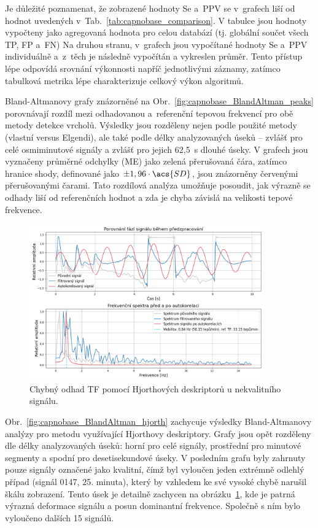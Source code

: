Je důležité poznamenat, že zobrazené hodnoty \acs{Se} a~\acs{PPV} se v~grafech liší od hodnot uvedených v~Tab.~\ref{tab:capnobase_comparison}.
V tabulce jsou hodnoty vypočteny jako agregovaná hodnota pro celou databází (tj. globální součet všech \acs{TP}, \acs{FP} a~\acs{FN})
Na druhou stranu, v~grafech jsou vypočítané hodnoty \acs{Se} a~\acs{PPV} individuálně a~z~těch je následně vypočítán a vykreslen průměr.
Tento přístup lépe odpovídá srovnání výkonnosti napříč jednotlivými záznamy, zatímco tabulková metrika lépe charakterizuje celkový výkon algoritmů.

Bland-Altmanovy grafy znázorněné na Obr.~\ref{fig:capnobase_BlandAltman_peaks} porovnávají rozdíl mezi odhadovanou a~referenční tepovou frekvencí pro obě metody detekce vrcholů.
Výsledky jsou rozděleny nejen podle použité metody (vlastní versus Elgendi), ale také podle délky analyzovaných úseků -- zvlášť pro celé osmiminutové signály a zvlášť pro jejich 62,5~s dlouhé úseky.
V grafech jsou vyznačeny průměrné odchylky (\acs{ME}) jako zelená přerušovaná čára, zatímco hranice shody, definované jako $\pm1,96 \cdot \acs{SD}$, jsou znázorněny červenými přerušovanými čarami.
Tato rozdílová analýza umožňuje posoudit, jak výrazně se odhady liší od referenčních hodnot a zda je chyba závislá na velikosti tepové frekvence.

\begin{figure}[!bh]
	\centering
	\includegraphics[width=0.9\textwidth]{./obrazky/vysledky/hjorth_preprocess_diffHR.png}
	\caption[Chybný odhad \acs{TF} pomocí Hjorthových deskriptorů u nekvalitního signálu]{Chybný odhad TF pomocí Hjorthových deskriptorů u nekvalitního signálu.}
	\label{fig:capnobase_hjorth_err}
\end{figure}

Obr.~\ref{fig:capnobase_BlandAltman_hjorth} zachycuje výsledky Bland-Altmanovy analýzy pro metodu využívající Hjorthovy deskriptory.
Grafy jsou opět rozděleny dle délky analyzovaných úseků: horní pro celé signály, prostřední pro minutové segmenty a spodní pro desetisekundové úseky.
V posledním grafu byly zahrnuty pouze signály označené jako kvalitní, čímž byl vyloučen jeden extrémně odlehlý případ (signál 0147, 25. minuta), který by vzhledem ke své vysoké chybě narušil škálu zobrazení.
Tento úsek je detailně zachycen na obrázku~\ref{fig:capnobase_hjorth_err}, kde je patrná výrazná deformace signálu a posun dominantní frekvence.
Společně s ním bylo vyloučeno dalších 15 signálů.

